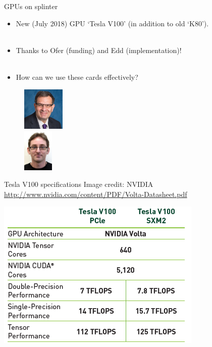 \documentclass[usenames,dvipsnames]{beamer}
\begin{document}
\begin{frame}{GPUs on splinter}
  \begin{block}{}
    \begin{itemize}
      \item{New (July 2018) GPU `Tesla V100' (in addition to old `K80').}\\~\
      \item{Thanks to Ofer (funding) and Edd (implementation)!}\\~\
      \item{How can we use these cards effectively?}
    \end{itemize}
  \end{block}
  \begin{figure}
  \begin{multicols}{2}
  \centering
  \includegraphics[width=0.18\textwidth]{Ofer_Lahav_photo_2014_SB_STFC.jpg}\\
  \includegraphics[width=0.13\textwidth]{Edward_Edmonson_2016_w.jpg}\\
  \end{multicols}
  \end{figure}
\end{frame}

\begin{frame}{Tesla V100 specifications} {\tiny Image credit: NVIDIA \url{http://www.nvidia.com/content/PDF/Volta-Datasheet.pdf}}
  \begin{block}{}
    \begin{center}
      \includegraphics[scale=0.90]{V100_specsheet_A.png}
    \end{center}
  \end{block}
\end{frame}
\end{document}

